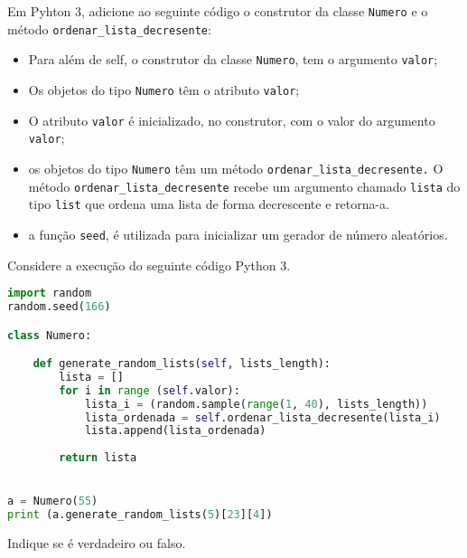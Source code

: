 \documentclass[12pt,varwidth=16cm,border=17pt]{standalone}
\begin{document}
Em Pyhton 3, adicione ao seguinte código o construtor da classe \verb+Numero+ e o método \verb+ordenar_lista_decresente+:

\begin{itemize}

  \item Para além de self, o construtor da classe \verb+Numero+, tem o argumento \verb+valor+;
  \item Os objetos do tipo \verb+Numero+ têm o atributo \verb+valor+;
  \item O atributo \verb+valor+ é inicializado, no construtor, com o valor
  do argumento \verb+valor+;
  \item os objetos do tipo \verb+Numero+ têm um método \verb+ordenar_lista_decresente.+ O
    método \verb+ordenar_lista_decresente+ recebe um argumento chamado \verb+lista+ do tipo
  \verb+list+ que ordena uma lista de forma decrescente e retorna-a.
    
  \item a função \verb+seed+, é utilizada para inicializar um gerador de número aleatórios.
    
\end{itemize}

Considere a execução do seguinte código Python 3.


\begin{lstlisting}[language=Python]
import random
random.seed(166)

class Numero:

    def generate_random_lists(self, lists_length):
        lista = []
        for i in range (self.valor):
            lista_i = (random.sample(range(1, 40), lists_length))
            lista_ordenada = self.ordenar_lista_decresente(lista_i)
            lista.append(lista_ordenada)
        
        return lista


a = Numero(55)
print (a.generate_random_lists(5)[23][4])
\end{lstlisting}

Indique se é verdadeiro ou falso.
\end{document}
